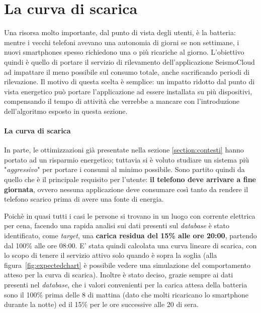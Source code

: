 \documentclass[a4paper,10pt]{memoir}
\begin{document}
\section{La curva di scarica}
\label{section:batteria}

Una risorsa molto importante, dal punto di vista degli utenti, è la batteria: mentre i vecchi telefoni avevano una autonomia di giorni se non settimane, i nuovi smartphones spesso richiedono una o più ricariche al giorno. L'obiettivo quindi è quello di portare il servizio di rilevamento dell'applicazione SeismoCloud ad impattare il meno possibile sul consumo totale, anche sacrificando periodi di rilevazione. Il motivo di questa scelta è semplice: un impatto ridotto dal punto di vista energetico può portare l'applicazione ad essere installata su più dispositivi, compensando il tempo di attività che verrebbe a mancare con l'introduzione dell'algoritmo esposto in questa sezione.

\paragraph{La curva di scarica} In parte, le ottimizzazioni già presentate nella sezione \ref{section:contesti} hanno portato ad un risparmio energetico; tuttavia si è voluto studiare un sistema più "\textit{aggressivo}" per portare i consumi al minimo possibile. Sono partito quindi da quello che è il principale requisito per l'utente: \textbf{il telefono deve arrivare a fine giornata}, ovvero nessuna applicazione deve consumare così tanto da rendere il telefono scarico prima di avere una fonte di energia.

Poichè in quasi tutti i casi le persone si trovano in un luogo con corrente elettrica per cena, facendo una rapida analisi sui dati presenti sul \textit{database} è stato identificato, come \textit{target}, una \textbf{carica residua del 15\% alle ore 20:00}, partendo dal 100\% alle ore 08:00. E' stata quindi calcolata una curva lineare di scarica, con lo scopo di tenere il servizio attivo solo quando è sopra la soglia (alla figura~\ref{fig:expectedchart} è possibile vedere una simulazione del comportamento atteso per la curva di scarica). Inoltre è stato deciso, grazie sempre ai dati presenti nel \textit{database}, che i valori convenienti per la carica attesa della batteria sono il 100\% prima delle 8 di mattina (dato che molti ricaricano lo smartphone durante la notte) ed il 15\% per le ore successive alle 20 di sera.

\pagebreak
\end{document}
